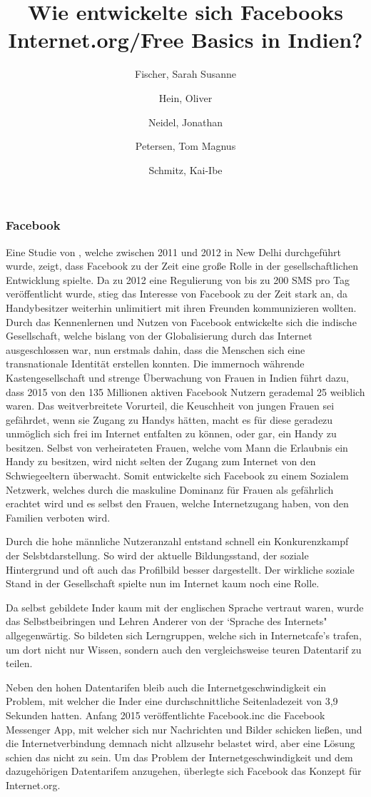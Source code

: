\documentclass{article}
\title{Wie entwickelte sich Facebooks Internet.org/Free Basics in Indien?}
\author{
  Fischer, Sarah Susanne\\
  \and
  Hein, Oliver\\
  \and
  Neidel, Jonathan\\
  \and
  Petersen, Tom Magnus\\
  \and
  Schmitz, Kai-Ibe\\
}
\begin{document}
\maketitle
\subsubsection {Facebook}
Eine Studie von \textcite{empowermentThroughFacebook}, welche zwischen 2011 und 2012 in New Delhi durchgeführt wurde, zeigt, dass Facebook zu der Zeit eine große Rolle in der gesellschaftlichen Entwicklung spielte. 
\medskip
Da zu 2012 eine Regulierung von bis zu 200 SMS pro Tag veröffentlicht wurde\autocite{PressInformation}, stieg das Interesse von Facebook zu der Zeit stark an,
da Handybesitzer weiterhin unlimitiert mit ihren Freunden kommunizieren wollten.
Durch das Kennenlernen und Nutzen von Facebook entwickelte sich die indische Gesellschaft, welche bislang von der Globalisierung durch das Internet ausgeschlossen war, nun erstmals dahin, dass die Menschen sich eine transnationale Identität erstellen konnten.
\medskip
Die immernoch währende Kastengesellschaft und strenge Überwachung von Frauen in Indien führt dazu, dass 2015 von den 135 Millionen aktiven Facebook Nutzern gerademal 25 weiblich waren. 
Das weitverbreitete Vorurteil, die Keuschheit von jungen Frauen sei gefährdet, wenn sie Zugang zu Handys hätten, macht es für diese geradezu unmöglich sich frei im Internet entfalten zu können, oder gar, ein Handy zu besitzen. Selbst von verheirateten Frauen, welche vom Mann die Erlaubnis ein Handy zu besitzen, wird nicht selten der Zugang zum Internet von den Schwiegeeltern überwacht.
Somit entwickelte sich Facebook zu einem Sozialem Netzwerk, welches durch die maskuline Dominanz für Frauen als gefährlich erachtet wird und es selbst den Frauen, welche Internetzugang haben, von den Familien verboten wird.


Durch die hohe männliche Nutzeranzahl entstand schnell ein Konkurenzkampf der Selsbtdarstellung. So wird der aktuelle Bildungsstand, der soziale Hintergrund und oft auch das Profilbild besser dargestellt. Der wirkliche soziale Stand in der Gesellschaft spielte nun im Internet kaum noch eine Rolle.

Da selbst gebildete Inder kaum mit der englischen Sprache vertraut waren, wurde das Selbstbeibringen und Lehren Anderer von der `Sprache des Internets" allgegenwärtig. So bildeten sich Lerngruppen, welche sich in Internetcafe's trafen, um dort nicht nur Wissen, sondern auch den vergleichsweise teuren Datentarif zu teilen.


Neben den hohen Datentarifen bleib auch die Internetgeschwindigkeit ein Problem, mit welcher die Inder eine durchschnittliche Seitenladezeit von 3,9 Sekunden hatten\autocite{mashable}. Anfang 2015 veröffentlichte Facebook.inc die Facebook Messenger App, mit welcher sich nur Nachrichten und Bilder schicken ließen, und die Internetverbindung demnach nicht allzusehr belastet wird, aber eine Lösung schien das nicht zu sein. 
\medskip
Um das Problem der Internetgeschwindigkeit und dem dazugehörigen Datentarifem anzugehen, überlegte sich Facebook das Konzept für Internet.org.



\end{document}
